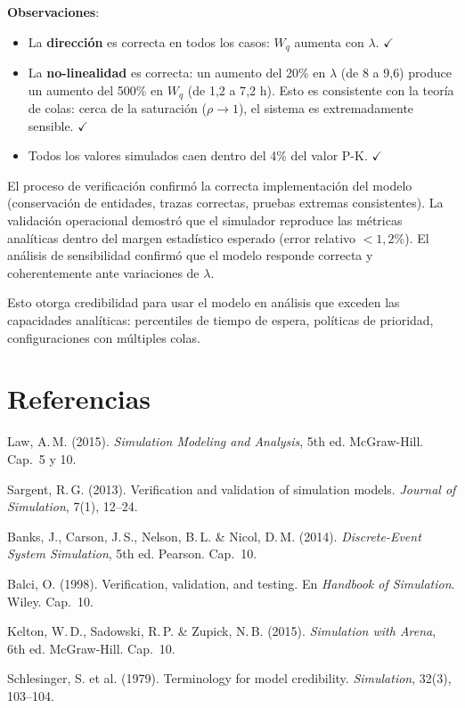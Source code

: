 \documentclass[11pt, letterpaper]{article}
\begin{document}
\textbf{Observaciones}:
\begin{itemize}
    \item La \textbf{dirección} es correcta en todos los casos: $W_q$ aumenta con $\lambda$. $\checkmark$
    \item La \textbf{no-linealidad} es correcta: un aumento del 20\% en $\lambda$ (de 8 a 9{,}6) produce un aumento del 500\% en $W_q$ (de 1{,}2 a 7{,}2 h). Esto es consistente con la teoría de colas: cerca de la saturación ($\rho \to 1$), el sistema es extremadamente sensible. $\checkmark$
    \item Todos los valores simulados caen dentro del 4\% del valor P-K. $\checkmark$
\end{itemize}

\begin{resultadobox}[Conclusión de V\&V]
El proceso de verificación confirmó la correcta implementación del modelo (conservación de entidades, trazas correctas, pruebas extremas consistentes). La validación operacional demostró que el simulador reproduce las métricas analíticas dentro del margen estadístico esperado (error relativo $< 1{,}2\%$). El análisis de sensibilidad confirmó que el modelo responde correcta y coherentemente ante variaciones de $\lambda$.

Esto otorga credibilidad para usar el modelo en análisis que exceden las capacidades analíticas: percentiles de tiempo de espera, políticas de prioridad, configuraciones con múltiples colas.
\end{resultadobox}

\section*{Referencias}

\begin{enumerate}[label={[\arabic*]}]
    \item Law, A.\,M. (2015). \textit{Simulation Modeling and Analysis}, 5th ed. McGraw-Hill. Cap.~5 y 10.
    \item Sargent, R.\,G. (2013). Verification and validation of simulation models. \textit{Journal of Simulation}, 7(1), 12--24.
    \item Banks, J., Carson, J.\,S., Nelson, B.\,L. \& Nicol, D.\,M. (2014). \textit{Discrete-Event System Simulation}, 5th ed. Pearson. Cap.~10.
    \item Balci, O. (1998). Verification, validation, and testing. En \textit{Handbook of Simulation}. Wiley. Cap.~10.
    \item Kelton, W.\,D., Sadowski, R.\,P. \& Zupick, N.\,B. (2015). \textit{Simulation with Arena}, 6th ed. McGraw-Hill. Cap.~10.
    \item Schlesinger, S. et al. (1979). Terminology for model credibility. \textit{Simulation}, 32(3), 103--104.
\end{enumerate}
\end{document}
